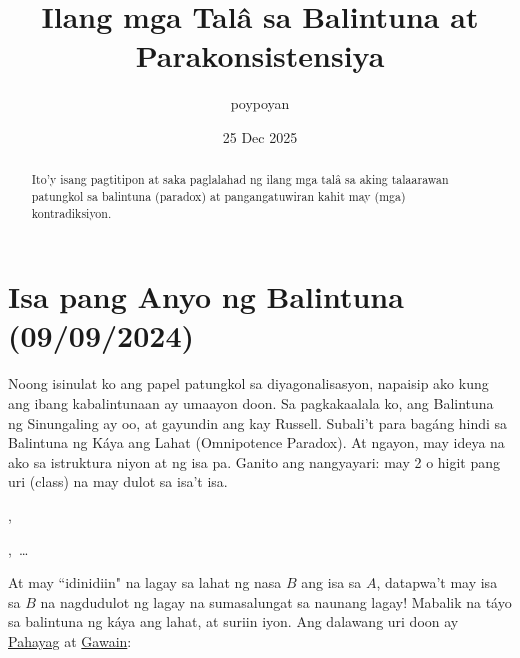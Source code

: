 \documentclass{article}
\title{Ilang mga Talâ sa Balintuna at Parakonsistensiya}
\author{poypoyan}
\date{25 Dec 2025}   %
\begin{document}
\maketitle

\begin{abstract}
Ito'y isang pagtitipon at saka paglalahad ng ilang mga talâ sa aking talaarawan patungkol sa balintuna (paradox) at pangangatuwiran kahit may (mga) kontradiksiyon.
\end{abstract}

\section{Isa pang Anyo ng Balintuna (09/09/2024)}
Noong isinulat ko ang papel patungkol sa diyagonalisasyon\cite{diagonal}, napaisip ako kung ang ibang kabalintunaan ay umaayon doon. Sa pagkakaalala ko, ang Balintuna ng Sinungaling ay oo, at gayundin ang kay Russell. Subali't para bagáng hindi sa Balintuna ng Káya ang Lahat (Omnipotence Paradox). At ngayon, may ideya na ako sa istruktura niyon at ng isa pa. Ganito ang nangyayari: may 2 o higit pang uri (class) na may dulot sa isa't isa.

\begin{center}
,
,\ \ldots
\end{center}

At may ``idinidiin" na lagay sa lahat ng nasa $B$ ang isa sa $A$, datapwa't may isa sa $B$ na nagdudulot ng lagay na sumasalungat sa naunang lagay! Mabalik na táyo sa balintuna ng káya ang lahat, at suriin iyon. Ang dalawang uri doon ay \underline{Pahayag} at \underline{Gawain}:

\begin{center}
\end{center}
\end{document}

